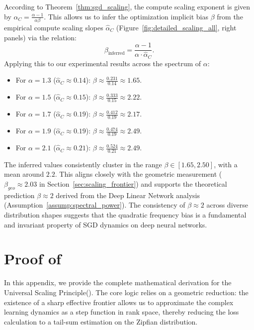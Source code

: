 \documentclass{article}
\theoremstyle{plain}
\theoremstyle{definition}
\theoremstyle{remark}
\begin{document}
According to Theorem~\ref{thm:sgd_scaling}, the compute scaling exponent is given by $\alpha_C = \frac{\alpha-1}{\alpha\beta}$. This allows us to infer the optimization implicit bias $\beta$ from the empirical compute scaling slopes $\hat{\alpha}_C$ (Figure~\ref{fig:detailed_scaling_all}, right panels) via the relation:
\begin{equation*}
    \beta_{\text{inferred}} = \frac{\alpha - 1}{\alpha \cdot \hat{\alpha}_C}.
\end{equation*}
Applying this to our experimental results across the spectrum of $\alpha$:
\begin{itemize}
    \item For $\alpha=1.3$ ($\hat{\alpha}_C \approx 0.14$): $\beta \approx \frac{0.231}{0.14} \approx 1.65$.
    \item For $\alpha=1.5$ ($\hat{\alpha}_C \approx 0.15$): $\beta \approx \frac{0.333}{0.15} \approx 2.22$.
    \item For $\alpha=1.7$ ($\hat{\alpha}_C \approx 0.19$): $\beta \approx \frac{0.412}{0.19} \approx 2.17$.
    \item For $\alpha=1.9$ ($\hat{\alpha}_C \approx 0.19$): $\beta \approx \frac{0.474}{0.19} \approx 2.49$.
    \item For $\alpha=2.1$ ($\hat{\alpha}_C \approx 0.21$): $\beta \approx \frac{0.524}{0.21} \approx 2.49$.
\end{itemize}
The inferred values consistently cluster in the range $\beta \in [1.65, 2.50]$, with a mean around $2.2$. This aligns closely with the geometric measurement ($\beta_{geo} \approx 2.03$ in Section~\ref{sec:scaling_frontier}) and supports the theoretical prediction $\beta \approx 2$ derived from the Deep Linear Network analysis (Assumption~\ref{assump:spectral_power}). The consistency of $\beta \approx 2$ across diverse distribution shapes suggests that the quadratic frequency bias is a fundamental and invariant property of SGD dynamics on deep neural networks.

\section{Proof of~}
\label{app:proof_sec4}

In this appendix, we provide the complete mathematical derivation for the Universal Scaling Principle(). The core logic relies on a geometric reduction: the existence of a sharp effective frontier allows us to approximate the complex learning dynamics as a step function in rank space, thereby reducing the loss calculation to a tail-sum estimation on the Zipfian distribution.
\end{document}
